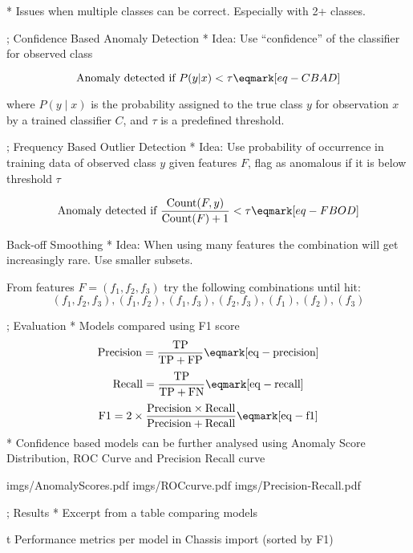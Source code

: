 * Issues when multiple classes can be correct. Especially with 2+ classes.

\pg;
\sec Confidence Based Anomaly Detection
* Idea: Use “confidence” of the classifier for observed class

$$\hbox{Anomaly detected if } P(y | x) < \tau \eqmark[eq-CBAD]$$

where $P(y∣x)$ is the probability assigned to the true class $y$ for observation $x$ by a trained classifier $C$, and $\tau$  is a predefined threshold.

\pg;
\sec Frequency Based Outlier Detection
* Idea: Use probability of occurrence in training data of observed class $y$ given features $F$, flag as anomalous if it is below threshold $\tau$

$$
\hbox{Anomaly detected if } {{\rm Count}(F, y)\over {\rm Count}(F) + 1} < \tau \eqmark[eq-FBOD]$$ 


\secc Back-off Smoothing
* Idea: When using many features the combination will get increasingly rare. Use smaller subsets.

From features $F=(f_1, f_2, f_3)$ try the following combinations until hit:
$$
(f_1, f_2, f_3), (f_1, f_2), (f_1, f_3), (f_2, f_3), (f_1), (f_2), (f_3)
$$

\pg;
\sec Evaluation
* Models compared using F1 score
$$\rm
{Precision} = {TP \over TP + FP} \eqmark[eq-precision]
$$
$$\rm
{Recall} = {TP \over TP + FN} \eqmark[eq-recall]
$$
$$\rm
{F1} = 2 \times { Precision \times Recall \over Precision + Recall} \eqmark[eq-f1]
$$
* Confidence based models can be further analysed using Anomaly Score Distribution, ROC Curve and Precision Recall curve

\medskip
\centerline{\picw=6cm \inspic imgs/AnomalyScores.pdf \inspic imgs/ROCcurve.pdf \inspic imgs/Precision-Recall.pdf  } 

\pg;
\sec Results
* Excerpt from a table comparing models
\midinsert {}
\caption/t Performance metrics per model in Chassis import (sorted by F1)
\endinsert

